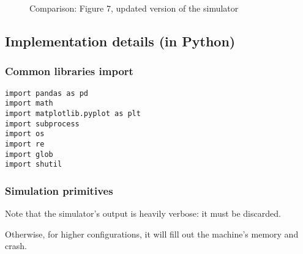 \documentclass[a4paper,11pt]{article} %
\begin{document}
    \begin{figure}[H]
        \centering
        \qquad
        \caption{Comparison: Figure 7, updated version of the simulator}
        \label{fig:comparison-f7-updated}
    \end{figure}

    \subsection{Implementation details (in Python)}\label{subsec:implementation-details-(in-python)}

    \subsubsection*{Common libraries import}

    \begin{verbatim}
import pandas as pd
import math
import matplotlib.pyplot as plt
import subprocess
import os
import re
import glob
import shutil
    \end{verbatim}

    \subsubsection*{Simulation primitives}

    Note that the simulator's output is heavily verbose: it must be discarded.

    \smallskip

    Otherwise, for higher configurations, it will fill out the machine's memory and crash.
\end{document}
